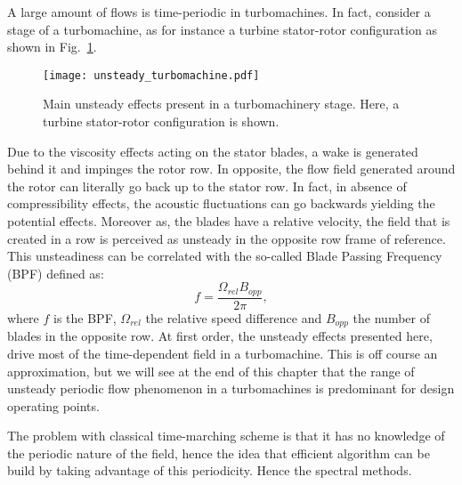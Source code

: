 A large amount of flows is time-periodic in turbomachines.
In fact, consider a stage of a turbomachine, as for instance
a turbine stator-rotor configuration as shown 
in Fig.~\ref{fig:sm_unsteady_turbomachine}. 
\begin{figure}[htbp]
  \centering
  \texttt{[image: unsteady\_turbomachine.pdf]}
  \caption{Main unsteady effects present in a turbomachinery stage. Here, a turbine stator-rotor
  configuration is shown.}
  \label{fig:sm_unsteady_turbomachine}
\end{figure}
Due to the
viscosity effects acting on the stator blades, 
a wake is generated behind it and 
impinges the rotor row. In opposite, the flow field
generated around the rotor can literally go back up
to the stator row. In fact, in absence of compressibility
effects, the acoustic fluctuations can go backwards yielding
the potential effects. Moreover as, the blades have a relative velocity,
the field that is created in a row is perceived as unsteady in the opposite 
row frame of reference. This unsteadiness can be
correlated with the so-called Blade Passing Frequency (BPF) defined as:
\begin{equation}
	f = \frac{\Omega_{rel} B_{opp}}{2 \pi},
\end{equation}
where $f$ is the BPF, $\Omega_{rel}$ the relative speed difference 
and $B_{opp}$ the number of blades in the opposite row.
At first order, the unsteady effects presented here, drive
most of the time-dependent field in a turbomachine. This 
is off course an approximation, but we will see at the end
of this chapter that the range of unsteady periodic
flow phenomenon in a turbomachines is predominant
for design operating points.

The problem with classical time-marching scheme is 
that it has no knowledge
of the periodic nature of the field, hence
the idea that efficient algorithm can be build by taking advantage 
of this periodicity. Hence the spectral methods.

